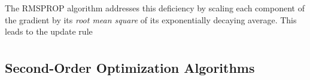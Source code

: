 \documentclass[11pt,a4paper]{article}
\numberwithin{equation}{section}
\begin{document}
The RMSPROP algorithm addresses this deficiency by scaling each component of the
gradient by its \emph{root mean square} of its exponentially decaying average.
This leads to the update rule
\begin{align*}
	
\end{align*}



\subsection{Second-Order Optimization Algorithms}



\end{document}
